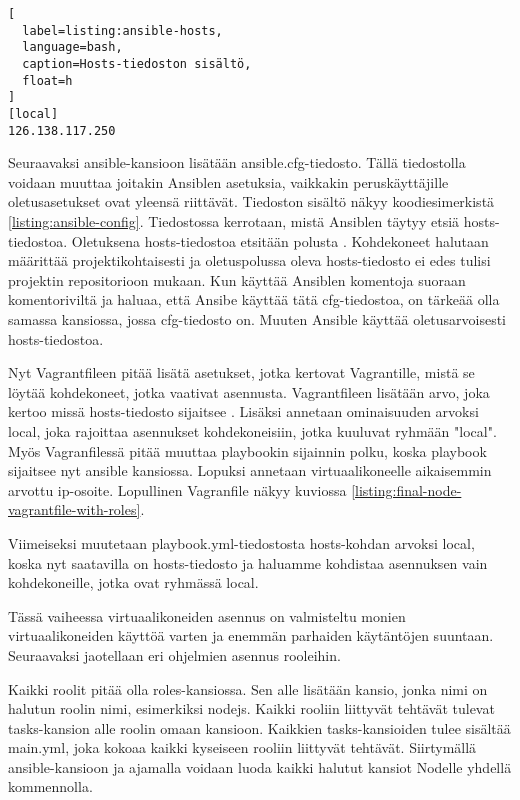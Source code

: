 \begin{lstlisting}[
  label=listing:ansible-hosts,
  language=bash,
  caption=Hosts-tiedoston sisältö,
  float=h
]
[local]
126.138.117.250
\end{lstlisting}

Seuraavaksi ansible-kansioon lisätään ansible.cfg-tiedosto. Tällä tiedostolla voidaan muuttaa joitakin Ansiblen asetuksia, vaikkakin peruskäyttäjille oletusasetukset ovat yleensä riittävät. Tiedoston sisältö näkyy koodiesimerkistä \ref{listing:ansible-config}. Tiedostossa kerrotaan, mistä Ansiblen täytyy etsiä hosts-tiedostoa. Oletuksena hosts-tiedostoa etsitään polusta  \cite{link:ansible-inventory}. Kohdekoneet halutaan määrittää projektikohtaisesti ja oletuspolussa oleva hosts-tiedosto ei edes tulisi projektin repositorioon mukaan. Kun käyttää Ansiblen komentoja suoraan komentoriviltä ja haluaa, että Ansibe käyttää tätä cfg-tiedostoa, on tärkeää olla samassa kansiossa, jossa cfg-tiedosto on. Muuten Ansible käyttää oletusarvoisesti hosts-tiedostoa.

Nyt Vagrantfileen pitää lisätä asetukset, jotka kertovat Vagrantille, mistä se löytää kohdekoneet, jotka vaativat asennusta. Vagrantfileen lisätään  arvo, joka kertoo missä hosts-tiedosto sijaitsee \cite{link:vagrant-ansible-settings}. Lisäksi annetaan  ominaisuuden arvoksi local, joka rajoittaa asennukset kohdekoneisiin, jotka kuuluvat ryhmään "local". Myös Vagranfilessä pitää muuttaa playbookin sijainnin polku, koska playbook sijaitsee nyt ansible kansiossa. Lopuksi annetaan virtuaalikoneelle aikaisemmin arvottu ip-osoite. Lopullinen Vagranfile näkyy kuviossa \ref{listing:final-node-vagrantfile-with-roles}.

Viimeiseksi muutetaan playbook.yml-tiedostosta hosts-kohdan arvoksi local, koska nyt saatavilla on hosts-tiedosto ja haluamme kohdistaa asennuksen vain kohdekoneille, jotka ovat ryhmässä local.

Tässä vaiheessa virtuaalikoneiden asennus on valmisteltu monien virtuaalikoneiden käyttöä varten ja enemmän parhaiden käytäntöjen suuntaan. Seuraavaksi jaotellaan eri ohjelmien asennus rooleihin.

Kaikki roolit pitää olla roles-kansiossa. Sen alle lisätään kansio, jonka nimi on halutun roolin nimi, esimerkiksi nodejs. Kaikki rooliin liittyvät tehtävät tulevat tasks-kansion alle roolin omaan kansioon. Kaikkien tasks-kansioiden tulee sisältää main.yml, joka kokoaa kaikki kyseiseen rooliin liittyvät tehtävät. Siirtymällä ansible-kansioon ja ajamalla  voidaan luoda kaikki halutut kansiot Nodelle yhdellä kommennolla.

